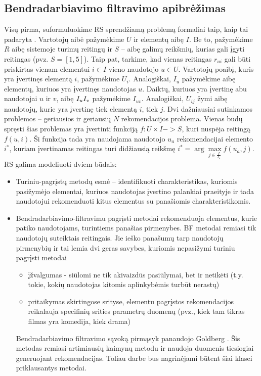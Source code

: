\documentclass{VUMIFInfMagistrinis}
\begin{document}
\subsection{Bendradarbiavimo filtravimo apibrėžimas}
Visų pirma, suformuluokime RS sprendžiamą problemą formaliai taip, kaip tai padaryta \cite{2}. Vartotojų aibė pažymėkime $U$ ir elementų aibę $I$. Be to, pažymėkime $R$ aibę sistemoje turimų reitingų ir $S$ – aibę galimų reikšmių, kurias gali įgyti reitingas (pvz. $S=[1,5]$). Taip pat, tarkime, kad vienas reitingas $r_{ui}$ gali būti priskirtas vienam elementui $i \in I$ vieno naudotojo $u \in U$. Vartotojų poaibį, kuris yra įvertinęs elementą $i$, pažymėkime $U_i$. Analogiškai, $I_u$ pažymėkime aibę elementų, kuriuos yra įvertinęs naudotojas $u$. Daiktų, kuriuos yra įvertinę abu naudotojai $u$ ir $v$, aibę $I_u \relax I_v$ pažymėkime $I_{uv}$. Analogiškai, $U_{ij}$ žymi aibę naudotojų, kurie yra įvertinę tiek elementą $i$, tiek $j$. Dvi dažniausiai sutinkamos problemos – geriausios ir geriausių $N$ rekomendacijos problema. Vienas būdų spręsti šias problemas yra įvertinti funkciją $f: U \times I -> S$, kuri nuspėja reitingą $f(u,i)$. Ši funkcija tada yra naudojama naudotojo $u_a$ rekomendacijai elemento $i^*$, kuriam įvertinamas reitingas turi didžiausią reikšmę $i^*= \arg \max \limits_{j \in \frac{I}{I_u}} f(u_a,j)$. 
RS galima modeliuoti dviem būdais:
\begin{itemize}
	\item Turiniu-pagrįstų metodų esmė – identifikuoti charakteristikas, kuriomis pasižymėjo elementai, kuriuos naudotojas įvertino palankiai praeityje ir tada naudotojui rekomenduoti kitus elementus su panašiomis charakteristikomis.
	\item Bendradarbiavimo-filtravimu pagrįsti metodai rekomenduoja elementus, kurie patiko naudotojams, turintiems panašias pirmenybes. BF metodai remiasi tik naudotojų suteiktais reitingais. Jie ieško panašumų tarp naudotojų pirmenybių ir tai lemia dvi geras savybes, kuriomis nepasižymi turiniu pagrįsti metodai
	\begin{itemize}
		\item įžvalgumas - siūlomi ne tik akivaizdūs pasiūlymai, bet ir netikėti (t.y. tokie, kokių naudotojas kitomis aplinkybėmis turbūt nerastų)
		\item pritaikymas skirtingose srityse, elementu pagrįstos rekomendacijos reikalauja specifinių srities parametrų duomenų (pvz., kiek tam tikras filmas yra komedija, kiek drama)
	\end{itemize}
	Bendradarbiavimo filtravimo sąvoką pirmąsyk panaudojo Goldberg \cite{16}. Šis metodas remiasi  artimiausių kaimynų metodu ir naudoja duomenis tiesiogiai generuojant rekomendacijas. Toliau darbe bus nagrinėjami būtent šiai klasei priklausantys metodai.
\end{itemize}
\end{document}
